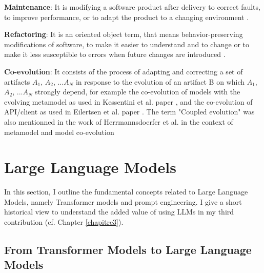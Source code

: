 \textbf{Maintenance}: It is modifying a software product after delivery to correct faults, to improve performance, or to adapt the product to a changing environment \cite{schneidewind1987state}.

\textbf{Refactoring}: It is an oriented object term, that means behavior-preserving modifications of software, to make it easier to understand and to change or to make it less susceptible to errors when future changes are introduced \cite{mens2004survey}. 

\textbf{Co-evolution}: It consists of the process of adapting and correcting a set of artifacts $A_1$, $A_2$, ...$A_N$ in response to the evolution of an artifact B on which $A_1$, $A_2$, ...$A_N$  strongly depend, for example the co-evolution of models with the evolving metamodel as used in Kessentini et al. paper \cite{Kessentini2016automated}, and the co-evolution of API/client as used in Eilertsen et al. paper \cite{8443581}. The term "Coupled evolution" was also mentionned in the work of Herrmannsdoerfer et al. in the context of metamodel and model co-evolution \cite{herrmannsdoerfer2009cope}





\section{Large Language Models}
\label{llm}
In this section, I outline the fundamental concepts related to Large Language Models, namely Transformer models and prompt engineering. I give a short historical view to understand the added value of using LLMs in my third contribution (cf. Chapter \ref{chapitre3}).


\subsection{From Transformer Models to Large Language Models}

